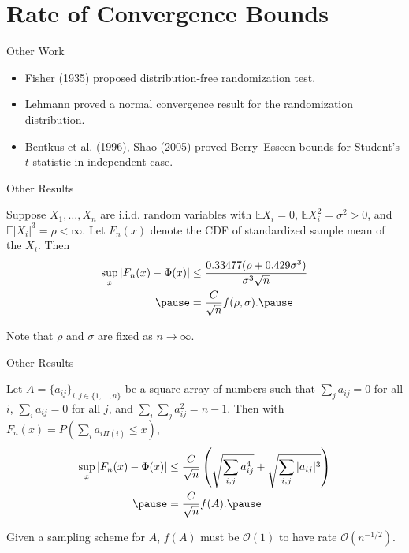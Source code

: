 \documentclass{beamer}
\newcommand{\E}{\mathbb{E}}
\begin{document}
\section{Rate of Convergence Bounds}
\begin{frame}{Other Work}
  \begin{itemize}
  \item Fisher (1935) proposed distribution-free
    randomization test.  \pause
  \item Lehmann proved a normal convergence
    result for the randomization distribution. \pause
  \item Bentkus et al. (1996), Shao (2005) proved Berry--Esseen bounds for
    Student's $t$-statistic in independent case.
  \end{itemize}
\end{frame}

\begin{frame}{Other Results}
  \begin{theorem}
  Suppose $X_1, \ldots, X_n$ are i.i.d. random variables with
  $\E X_i = 0$, $\E X_i^2 = \sigma^2 > 0$, and $\E |X_i|^3 = \rho
  < \infty$.  Let $F_n(x)$ denote the CDF of standardized sample mean
  of the $X_i$.  Then
  \begin{align*}
    \sup_x |F_n(x) - \Phi(x)| &\leq \frac{0.33477(\rho + 0.429\sigma^3)}{\sigma^3 \sqrt{n}} \\ \pause
    &= \frac{C}{\sqrt{n}} f(\rho, \sigma). \pause
  \end{align*}
  \end{theorem}
  Note that $\rho$ and $\sigma$ are fixed as $n \to \infty$.
\end{frame}

\begin{frame}{Other Results}
  \begin{theorem}
    Let $A = \{a_{ij}\}_{i, j \in \{1, \ldots, n\}}$ be a square array of
      numbers such that $\sum_j a_{ij} = 0$ for all $i$, $\sum_i
      a_{ij} = 0$ for all $j$, and $\sum_i \sum_j a_{ij}^2 = n - 1$.
      Then with $F_n(x) = P(\sum_i a_{i\Pi(i)} \leq x)$,
  \begin{align*}
    \sup_x |F_n(x) - \Phi(x)| &\leq \frac{C}{\sqrt{n}}
    \left (
      \sqrt{\sum_{i,j}a_{ij}^4} + \sqrt{\sum_{i,j}|a_{ij}|^3}
    \right ) \\ \pause
    &= \frac{C}{\sqrt{n}} f(A). \pause
  \end{align*}
  \end{theorem}
  Given a sampling scheme for $A$, $f(A)$ must be $\mathcal{O}(1)$ to have rate $\mathcal{O}(n^{-1/2})$.
\end{frame}
\end{document}
